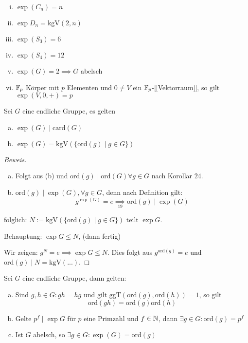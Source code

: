 \documentclass[a4paper]{report}
\begin{document}
\begin{bsp*}[Übung] \item
\begin{enumerate}[(i)]
\item $\exp (C_{n}) = n$
\item $\exp D_{n} = \mathrm{kgV}(2,n)$
\item $\exp(S_{3}) = 6$
\item $\exp(S_{4}) = 12$
\item $\exp(G) = 2 \implies G$ abelsch
\item $\Bbb F_{p}$ Körper mit $p$ Elementen und $0 \neq V$ ein $\Bbb F_{p}$-[[Vektorraum]], so gilt $\exp(V, 0, +) = p$
\end{enumerate}
\end{bsp*}

\begin{satz}
  Sei $G$ eine endliche Gruppe, es gelten
  \begin{enumerate}[(a)]
    \item $\exp(G) \mid \mathrm{card}(G)$
    \item $\exp(G) = \mathrm{kgV}(\{\mathrm{ord}(g)\mid g \in G\})$
  \end{enumerate}
\begin{proof}[Beweis] \item
\begin{enumerate}[(a)]
\item Folgt aus (b) und $\mathrm{ord}(g) \mid \mathrm{ord}(G) \forall g \in G$ nach Korollar 24.
\item $\mathrm{ord}(g) \mid \exp(G), \forall g \in G$, denn nach Definition gilt:
$$g^{\exp(G)} = e \underset{19} \implies \mathrm{ord}(g ) \mid \exp(G)$$
\end{enumerate}
folglich: $N:= \mathrm{kgV}(\{\mathrm{ord}(g) \mid g \in G\})$ teilt $\exp G$.

        Behauptung: $\exp G \le N$, (dann fertig)

        Wir zeigen: $g^{N} = e \implies \exp G \le N$.
Dies folgt aus $g^{\mathrm{ord}(g)} = e$ und $\mathrm{ord}(g) \mid N = \mathrm{kgV}(...).$
\end{proof}
\end{satz}

\begin{ubng}%
  Sei $G$ eine endliche Gruppe, dann gelten:
  \begin{enumerate}[(a)]
    \item Sind $g,h \in G : gh = hg$ und gilt $\mathrm{ggT}(\mathrm{ord}(g), \mathrm{ord}(h)) = 1$, so gilt $$\mathrm{ord}(gh) = \mathrm{ord}(g)\mathrm{ord}(h)$$
    \item Gelte $p^{f} \mid \exp G$ für $p$ eine Primzahl und $f \in \Bbb N$, dann $\exists g \in G : \mathrm{ord}(g) = p^{f}$
    \item Ist $G$ abelsch, so $\exists g \in G : \exp (G) = \mathrm{ord}(g)$
  \end{enumerate}
\end{ubng}
\end{document}
